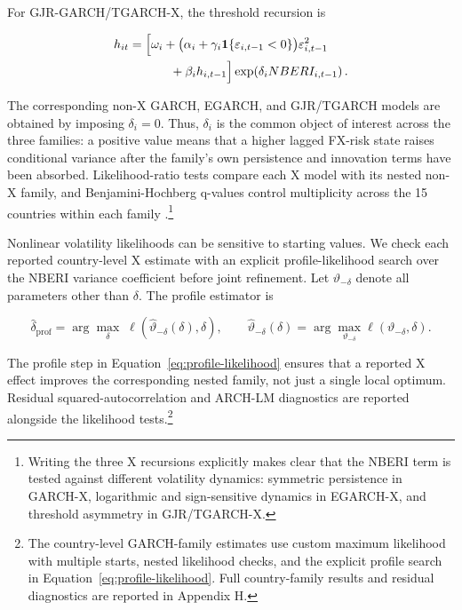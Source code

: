 \documentclass[11pt]{article}
\begin{document}
For GJR-GARCH/TGARCH-X, the threshold recursion is

\begin{equation}
\label{eq:gjrx-country}
\begin{aligned}
h_{it}
={}&\Bigl[\omega_i+
\bigl(\alpha_i+\gamma_i\mathbf{1}\{\varepsilon_{i,t-1}<0\}\bigr)
\varepsilon_{i,t-1}^{2}\\
&\qquad+\beta_i h_{i,t-1}\Bigr]
\exp\!\left(\delta_i NBERI_{i,t-1}\right).
\end{aligned}
\end{equation}

The corresponding non-X GARCH, EGARCH, and GJR/TGARCH models are obtained by imposing $\delta_i=0$. Thus, $\delta_i$ is the common object of interest across the three families: a positive value means that a higher lagged FX-risk state raises conditional variance after the family's own persistence and innovation terms have been absorbed. Likelihood-ratio tests compare each X model with its nested non-X family, and Benjamini-Hochberg q-values control multiplicity across the 15 countries within each family \citep{benjamini1995}.\footnote{Writing the three X recursions explicitly makes clear that the NBERI term is tested against different volatility dynamics: symmetric persistence in GARCH-X, logarithmic and sign-sensitive dynamics in EGARCH-X, and threshold asymmetry in GJR/TGARCH-X.}

Nonlinear volatility likelihoods can be sensitive to starting values.
We check each reported country-level X estimate with an explicit
profile-likelihood search over the NBERI variance coefficient before
joint refinement. Let $\vartheta_{-\delta}$ denote all parameters other
than $\delta$. The profile estimator is

\begin{equation}
\label{eq:profile-likelihood}
\widehat{\delta}_{\mathrm{prof}}
=\arg\max_{\delta}\;
\ell\!\left(\widehat{\vartheta}_{-\delta}(\delta),\delta\right),
\qquad
\widehat{\vartheta}_{-\delta}(\delta)
=\arg\max_{\vartheta_{-\delta}}
\ell\!\left(\vartheta_{-\delta},\delta\right).
\end{equation}

The profile step in Equation~\eqref{eq:profile-likelihood} ensures that a reported X effect improves the corresponding nested family, not just a single local optimum. Residual squared-autocorrelation and ARCH-LM diagnostics are reported alongside the likelihood tests.\footnote{The country-level GARCH-family estimates use custom maximum likelihood with multiple starts, nested likelihood checks, and the explicit profile search in Equation~\eqref{eq:profile-likelihood}. Full country-family results and residual diagnostics are reported in Appendix H.}
\end{document}
